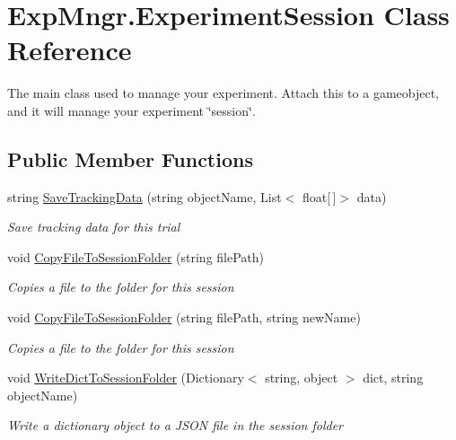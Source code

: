 \hypertarget{class_exp_mngr_1_1_experiment_session}{}\section{Exp\+Mngr.\+Experiment\+Session Class Reference}
\label{class_exp_mngr_1_1_experiment_session}


The main class used to manage your experiment. Attach this to a gameobject, and it will manage your experiment \char`\"{}session\char`\"{}.  


\subsection*{Public Member Functions}
\begin{DoxyCompactItemize}
\item 
string \hyperlink{class_exp_mngr_1_1_experiment_session_adc9d191c695ceaf556db928cdfed8a74}{Save\+Tracking\+Data} (string object\+Name, List$<$ float\mbox{[}$\,$\mbox{]}$>$ data)
\begin{DoxyCompactList}\small\item\em Save tracking data for this trial \end{DoxyCompactList}\item 
void \hyperlink{class_exp_mngr_1_1_experiment_session_ab1307a5e616ae5afb588ddcfec4c5dd6}{Copy\+File\+To\+Session\+Folder} (string file\+Path)
\begin{DoxyCompactList}\small\item\em Copies a file to the folder for this session \end{DoxyCompactList}\item 
void \hyperlink{class_exp_mngr_1_1_experiment_session_a68aaa1dbe21a0369db6425beea64ed84}{Copy\+File\+To\+Session\+Folder} (string file\+Path, string new\+Name)
\begin{DoxyCompactList}\small\item\em Copies a file to the folder for this session \end{DoxyCompactList}\item 
void \hyperlink{class_exp_mngr_1_1_experiment_session_a2c8bfa562d1cf0e5ba511088bf9355c7}{Write\+Dict\+To\+Session\+Folder} (Dictionary$<$ string, object $>$ dict, string object\+Name)
\begin{DoxyCompactList}\small\item\em Write a dictionary object to a J\+S\+ON file in the session folder \end{DoxyCompactList}\item 

\end{DoxyCompactItemize}
